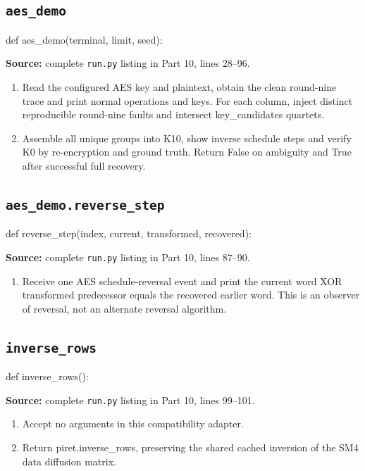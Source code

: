 \subsection{\texttt{aes\_\allowbreak{}demo}}
\begin{lightcode}
def aes_demo(terminal, limit, seed):
\end{lightcode}
\noindent\textbf{Source:} complete \texttt{run.py} listing in Part 10, lines 28--96.
\begin{enumerate}
\item Read the configured AES key and plaintext, obtain the clean round-nine trace and print normal operations and keys. For each column, inject distinct reproducible round-nine faults and intersect key\_candidates quartets.
\item Assemble all unique groups into K10, show inverse schedule steps and verify K0 by re-encryption and ground truth. Return False on ambiguity and True after successful full recovery.
\end{enumerate}
\subsection{\texttt{aes\_\allowbreak{}demo.reverse\_\allowbreak{}step}}
\begin{lightcode}
def reverse_step(index, current, transformed, recovered):
\end{lightcode}
\noindent\textbf{Source:} complete \texttt{run.py} listing in Part 10, lines 87--90.
\begin{enumerate}
\item Receive one AES schedule-reversal event and print the current word XOR transformed predecessor equals the recovered earlier word. This is an observer of reversal, not an alternate reversal algorithm.
\end{enumerate}
\subsection{\texttt{inverse\_\allowbreak{}rows}}
\begin{lightcode}
def inverse_rows():
\end{lightcode}
\noindent\textbf{Source:} complete \texttt{run.py} listing in Part 10, lines 99--101.
\begin{enumerate}
\item Accept no arguments in this compatibility adapter.
\item Return piret.inverse\_rows, preserving the shared cached inversion of the SM4 data diffusion matrix.
\end{enumerate}
